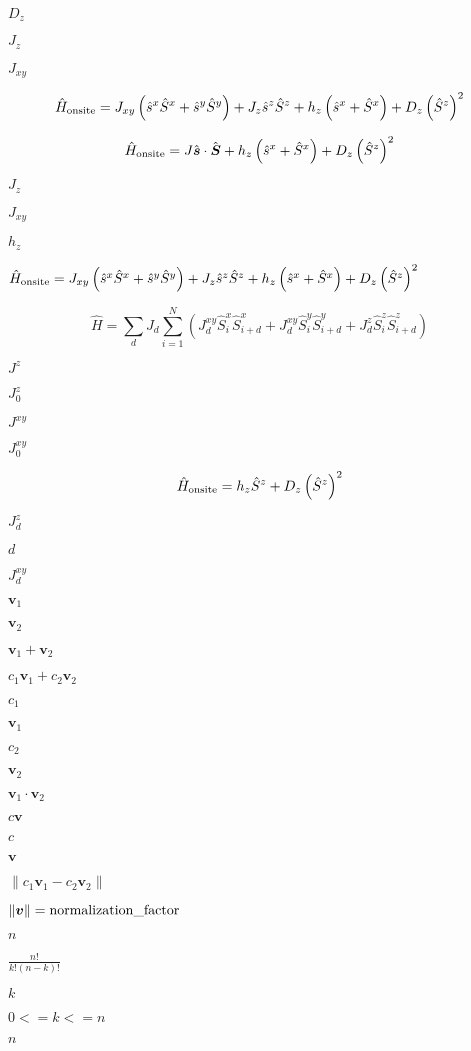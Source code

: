 \documentclass{article}
\begin{document}
$ D_z$
\pagebreak

$J_z $
\pagebreak

$J_{xy} $
\pagebreak

\[ \hat{H}_{\rm onsite}= J_{xy}\left(\hat{s}^{x}\hat{S}^{x}+\hat{s}^{y}\hat{S}^{y}\right)+J_{z}\hat{s}^{z}\hat{S}^{z} + h_z\left(\hat{s}^{x} + \hat{S}^{x}\right) + D_z\left(\hat{S}^{z}\right)^2 \]
\pagebreak

\[ \hat{H}_{\rm onsite}= J\hat{\boldsymbol{s}}\cdot\hat{\boldsymbol{S}} + h_z\left(\hat{s}^{x} + \hat{S}^{x}\right) + D_z\left(\hat{S}^{z}\right)^2 \]
\pagebreak

$ J_{z} $
\pagebreak

$ J_{xy} $
\pagebreak

$ h_z$
\pagebreak

$ \hat{H}_{\rm onsite}= J_{xy}\left(\hat{s}^{x}\hat{S}^{x}+\hat{s}^{y}\hat{S}^{y}\right)+J_{z}\hat{s}^{z}\hat{S}^{z} + h_z\left(\hat{s}^{x} + \hat{S}^{x}\right) + D_z\left(\hat{S}^{z}\right)^2 $
\pagebreak

\[ \hat{H}=\sum_{d}J_{d}\sum^{N}_{i=1}\left(J^{xy}_{d}\hat{S}^{x}_{i}\hat{S}^{x}_{i+d}+ J^{xy}_{d}\hat{S}^{y}_{i}\hat{S}^{y}_{i+d}+ J^{z}_{d}\hat{S}^{z}_{i}\hat{S}^{z}_{i+d}\right) \]
\pagebreak

$ J^{z} $
\pagebreak

$ J^{z}_{0} $
\pagebreak

$ J^{xy} $
\pagebreak

$ J^{xy}_{0} $
\pagebreak

\[ \hat{H}_{\rm onsite}=h_z\hat{S}^{z}+D_z\left(\hat{S}^{z}\right)^{2}\]
\pagebreak

$ J^{z}_{d} $
\pagebreak

$ d$
\pagebreak

$ J^{xy}_{d} $
\pagebreak

$ \boldsymbol{v}_1 $
\pagebreak

$ \boldsymbol{v}_2 $
\pagebreak

$ \boldsymbol{v}_1 + \boldsymbol{v}_2$
\pagebreak

$ c_1\boldsymbol{v}_1 + c_2\boldsymbol{v}_2 $
\pagebreak

$ c_1 $
\pagebreak

$ \boldsymbol{v}_1$
\pagebreak

$ c_2 $
\pagebreak

$ \boldsymbol{v}_2$
\pagebreak

$ \boldsymbol{v}_1\cdot\boldsymbol{v}_2 $
\pagebreak

$ c\boldsymbol{v} $
\pagebreak

$ c$
\pagebreak

$ \boldsymbol{v}$
\pagebreak

$ \|c_1\boldsymbol{v}_1 - c_2\boldsymbol{v}_2\| $
\pagebreak

$\|\boldsymbol{v}\|={\rm normalization\_factor} $
\pagebreak

$ n $
\pagebreak

$ \frac{n!}{k!(n-k)!} $
\pagebreak

$ k $
\pagebreak

$ 0 <= k <= n$
\pagebreak

$ n$
\pagebreak
\end{document}
